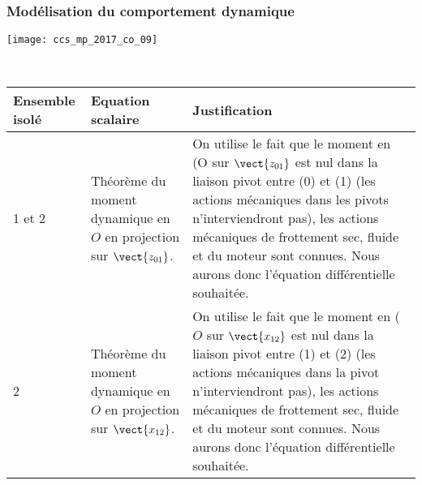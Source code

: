 \subsubsection{Modélisation du comportement dynamique}

\ifprof
\begin{corrige}
\begin{center}

\texttt{[image: ccs\_mp\_2017\_co\_09]}

\end{center}
\end{corrige}
\else
\fi


\ifprof
\begin{corrige} ~\\
\begin{center}
\begin{tabular}{lp{5cm}p{7cm}}
\hline
\textbf{Ensemble isolé} & \textbf{Equation scalaire} & \textbf{Justification} \\
\hline
 1 et 2 & 
Théorème du moment dynamique en $O$ en projection sur $\vect{z_{01}}$. 
& On utilise le fait que le moment en (O sur $\vect{z_{01}}$ est nul dans la liaison pivot entre (0) et (1) (les actions mécaniques dans les pivots n’interviendront pas), les actions mécaniques de frottement sec, fluide et du moteur sont connues. Nous aurons donc l’équation différentielle souhaitée. \\
 2 &	
Théorème du moment dynamique en $O$ en projection sur $\vect{x_{12}}$. 
&On utilise le fait que le moment en ($O$ sur $\vect{x_{12}}$ est nul dans la liaison pivot entre (1) et (2) (les actions mécaniques dans la pivot n’interviendront pas), les actions mécaniques de frottement sec, fluide et du moteur sont connues. Nous aurons donc l’équation différentielle souhaitée. \\
\hline
\end{tabular}
\end{center}
\end{corrige}
\else
\fi



